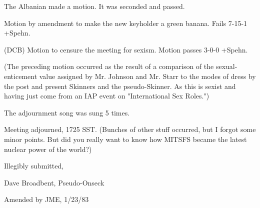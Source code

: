 \documentclass[12pt]{article}
\begin{document}
The Albanian made a motion. It was seconded and passed.

Motion by amendment to make the new keyholder a green banana. Fails 7-15-1 +Spehn.

(DCB) Motion to censure the meeting for sexism. Motion passes 3-0-0 +Spehn.

(The preceding motion occurred as the result of a comparison of the sexual-enticement value assigned by Mr. Johnson and Mr. Starr to the modes of dress by the post and present Skinners and the pseudo-Skinner. As this is sexist and having just come from an IAP event on "International Sex Roles.")

The adjournment song was sung 5 times.

\vspace{12pt}

\noindent
Meeting adjourned, 1725 SST. (Bunches of other stuff occurred, but I forgot some minor points. But did you really want to know how MITSFS became the latest nuclear power of the world?)

\vspace{18pt}

\centerline{Illegibly submitted,}
\centerline{Dave Broadbent, Pseudo-Onseck}
\centerline{Amended by JME, 1/23/83}
\end{document}

